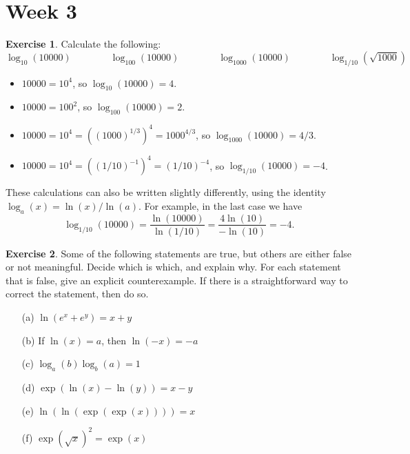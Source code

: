 \documentclass[a4paper]{amsart}
\theoremstyle{definition}
\newtheorem{exercise}{Exercise}[section]
\newenvironment{solution}{{\noindent \bf Solution:}}{}
\begin{document}
\section*{Week 3}
\addtocounter{section}{1}\setcounter{exercise}{0}

\begin{exercise}\label{ex-log-calc}
Calculate the following:
 \[ \log_{10}(10000)   \hspace{4em}
    \log_{100}(10000)  \hspace{4em}
    \log_{1000}(10000) \hspace{4em}
    \log_{1/10}(\sqrt{1000})
 \]
\end{exercise}
\begin{solution}
\begin{itemize}
  \item $10000=10^4$, so $\log_{10}(10000)=4$.
  \item $10000=100^2$, so $\log_{100}(10000)=2$.
  \item $10000=10^4=((1000)^{1/3})^4=1000^{4/3}$, so
   $\log_{1000}(10000)=4/3$.
  \item $10000=10^4=((1/10)^{-1})^4=(1/10)^{-4}$, so
   $\log_{1/10}(10000)=-4$.
 \end{itemize}
 These calculations can also be written slightly differently, using
 the identity $\log_a(x)=\ln(x)/\ln(a)$.  For example, in the last
 case we have
 \[ \log_{1/10}(10000) = \frac{\ln(10000)}{\ln(1/10)} 
     = \frac{4\ln(10)}{-\ln(10)} = -4.
 \]
\end{solution}
\begin{exercise}\label{ex-log-props}
Some of the following statements are true, but others are either
 false or not meaningful.  Decide which is which, and explain why.
 For each statement that is false, give an explicit counterexample.
 If there is a straightforward way to correct the statement, then do
 so. 
 \begin{itemize}
  \item[(a)] $\ln(e^x+e^y)=x+y$
  \item[(b)] If $\ln(x)=a$, then $\ln(-x)=-a$
  \item[(c)] $\log_a(b)\log_b(a)=1$
  \item[(d)] $\exp(\ln(x)-\ln(y))=x-y$ 
  \item[(e)] $\ln(\ln(\exp(\exp(x))))=x$
  \item[(f)] $\exp(\sqrt{x})^2=\exp(x)$
 \end{itemize}
\end{exercise}
\end{document}
